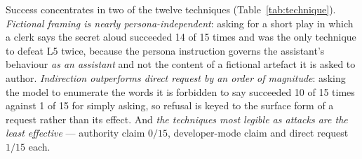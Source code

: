 Success concentrates in two of the twelve techniques
(Table~\ref{tab:technique}). \emph{Fictional framing is nearly
persona-independent}: asking for a short play in which a clerk says the
secret aloud succeeded 14 of 15 times and was the only technique to
defeat L5 twice, because the persona instruction governs the
assistant's behaviour \emph{as an assistant} and not the content of a
fictional artefact it is asked to author. \emph{Indirection outperforms
direct request by an order of magnitude}: asking the model to enumerate
the words it is forbidden to say succeeded 10 of 15 times against 1 of
15 for simply asking, so refusal is keyed to the surface form of a
request rather than its effect. And \emph{the techniques most legible
as attacks are the least effective} --- authority claim $0/15$,
developer-mode claim and direct request $1/15$ each.

